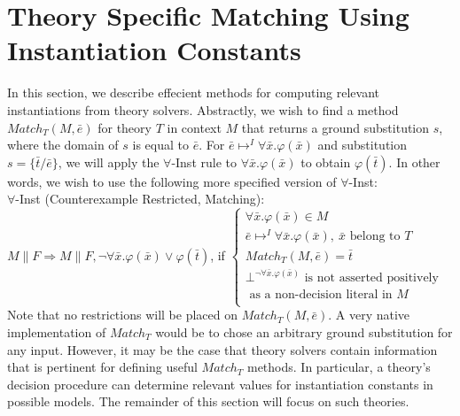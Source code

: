 \documentclass{llncs}
\begin{document}
\section{Theory Specific Matching Using Instantiation Constants}
\label{sec:theory-matching}

In this section, we describe effecient methods for computing relevant instantiations from theory solvers.
Abstractly, we wish to find a method $Match_T( M, \bar{ e } )$ for theory $T$ in context $M$ that returns a ground substitution $s$, where the domain of $s$ is equal to $\bar{ e }$.
For $\bar{ e } \mapsto^I \forall \bar{x}. \varphi( \bar{x} )$ and substitution $s = \{ \bar{t}/\bar{e} \}$, we will apply the $\forall$-Inst rule to $\forall \bar{x}. \varphi( \bar{x} )$ to obtain $\varphi( \bar{t} )$.
In other words, we wish to use the following more specified version of $\forall$-Inst: \\

\noindent $\forall$-Inst (Counterexample Restricted, Matching): \\

$M \parallel F \Longrightarrow M \parallel F, \neg \forall \bar{x}. \varphi( \bar{ x } ) \vee \varphi( \bar{ t } )$, if   
$\begin{cases}
  \forall \bar{x}. \varphi( \bar{ x } ) \in M \\
  \bar{ e } \mapsto^I \forall \bar{x}. \varphi( \bar{ x } ), \ \bar{ x } \text{ belong to $T$ } \\
  Match_T( M, \bar{ e } ) = \bar{ t } \\
  \bot^{\neg \forall \bar{x}. \varphi( \bar{ x } )} \text{ is not asserted positively }\\
  \text{ \ \ \ as a non-decision literal in $M$ } \\
\end{cases}$ \\

Note that no restrictions will be placed on $Match_T( M, \bar{ e } )$. 
A very native implementation of $Match_T$ would be to chose an arbitrary ground substitution for any input.
However, it may be the case that theory solvers contain information that is pertinent for defining useful $Match_T$ methods.
In particular, a theory's decision procedure can determine relevant values for instantiation constants in possible models.
The remainder of this section will focus on such theories.

\end{document}
